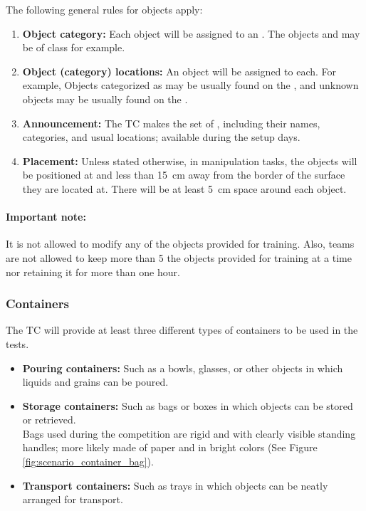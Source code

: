 The following general rules for objects apply:

\begin{enumerate}
	\item \textbf{Object category:} Each object will be assigned to an . The objects  and  may be of class  for example.

	\item \textbf{Object (category) locations:} An  object will be assigned to each. For example, Objects categorized as  may be usually found on the , and unknown objects  may be usually found on the .

	\item \textbf{Announcement:} The TC makes the set of , including their names, categories, and usual locations; available during the setup days. 
	
	\item \textbf{Placement:}  Unless stated otherwise, in manipulation tasks, the objects will be positioned at  and less than \SI{15}{\centi\meter} away from the border of the surface they are located at. There will be at least \SI{5}{\centi\meter} space around each object.
\end{enumerate}

\paragraph*{Important note:} It is not allowed to modify any of the objects provided for training. Also, teams are not allowed to keep more than 5 the objects provided for training at a time nor retaining it for more than one hour.

\subsubsection{Containers}
The TC will provide at least three different types of containers to be used in the tests.

\begin{itemize}
	\item \textbf{Pouring containers:} Such as a bowls, glasses, or other objects in which liquids and grains can be poured.

	\item \textbf{Storage containers:} Such as bags or boxes in which objects can be stored or retrieved.\\
	Bags used during the competition are rigid and with clearly visible standing handles; more likely made of paper and in bright colors (See Figure \ref{fig:scenario_container_bag}).

	\item \textbf{Transport containers:} Such as trays in which objects can be neatly arranged for transport.
\end{itemize}

